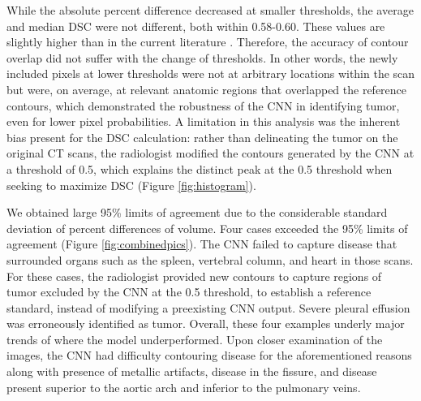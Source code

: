 \documentclass{article}
\begin{document}
While the absolute percent difference decreased at smaller thresholds, the average and median DSC were not different, both within 0.58-0.60. These values are slightly higher than in the current literature \cite{Kidd}. Therefore, the accuracy of contour overlap did not suffer with the change of thresholds. In other words, the newly included pixels at lower thresholds were not at arbitrary locations within the scan but were, on average, at relevant anatomic regions that overlapped the reference contours, which demonstrated the robustness of the CNN in identifying tumor, even for lower pixel probabilities. A limitation in this analysis was the inherent bias present for the DSC calculation: rather than delineating the tumor on the original CT scans, the radiologist modified the contours generated by the CNN at a threshold of 0.5, which explains the distinct peak at the 0.5 threshold when seeking to maximize DSC (Figure \ref{fig:histogram}). 

We obtained large 95\% limits of agreement due to the considerable standard deviation of percent differences of volume. Four cases exceeded the 95\% limits of agreement (Figure \ref{fig:combinedpics}). The CNN failed to capture disease that surrounded organs such as the spleen, vertebral column, and heart in those scans. For these cases, the radiologist provided new contours to capture regions of tumor excluded by the CNN at the 0.5 threshold, to establish a reference standard, instead of modifying a preexisting CNN output. Severe pleural effusion was erroneously identified as tumor. Overall, these four examples underly major trends of where the model underperformed. Upon closer examination of the images, the CNN had difficulty contouring disease for the aforementioned reasons along with presence of metallic artifacts, disease in the fissure, and disease present superior to the aortic arch and inferior to the pulmonary veins. 
\end{document}
